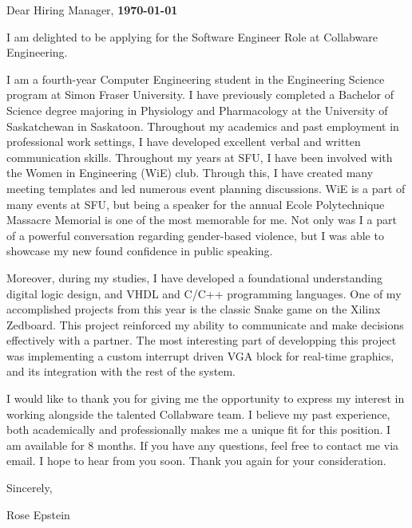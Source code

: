 \documentclass[letterpaper,11pt]{article}
\newcommand{\roleName}{Software Engineer Role at Collabware Engineering}
\begin{document}
    \vspace*{10pt}
    \par Dear Hiring Manager,  \hfill \textbf{\today}
    \vspace*{10pt}
    \par I am delighted to be applying for the \roleName{}.
    \vspace*{10pt}
    \par I am a fourth-year Computer Engineering student in the Engineering Science program at Simon Fraser University. I have 
    previously completed a Bachelor of Science degree majoring in Physiology and Pharmacology at the University of Saskatchewan in Saskatoon.
    Throughout my academics and past employment in professional work settings, I have developed excellent verbal and written communication skills. 
    Throughout my years at SFU, I have been involved with the Women in Engineering (WiE) club. Through this, I have created many meeting templates and led numerous event planning discussions. 
    WiE is a part of many events at SFU, but being a speaker for the annual Ecole Polytechnique Massacre Memorial is one of the most memorable for me. 
    Not only was I a part of a powerful conversation regarding gender-based violence, but I was able to showcase my new found confidence in public speaking. 
    \vspace*{10pt}
    \par Moreover, during my studies, I have developed a foundational understanding digital logic design, and VHDL and C/C++ programming languages. One of my accomplished projects from this year is the classic Snake game
    on the Xilinx Zedboard. This project reinforced my ability to communicate and make decisions effectively with a partner. 
    The most interesting part of developping this project was implementing a custom interrupt driven VGA block for real-time graphics, 
    and its integration with the rest of the system.
    \vspace*{10pt}
    \par I would like to thank you for giving me the opportunity to express my interest in working alongside
    the talented Collabware team. I believe my past experience, both academically and professionally makes
    me a unique fit for this position. I am available for 8 months. If you have any questions, feel free to contact me via email. I hope to hear from you
    soon. Thank you again for your consideration.
    \vspace*{10pt}
    \par Sincerely,
    \par Rose Epstein
\end{document}
